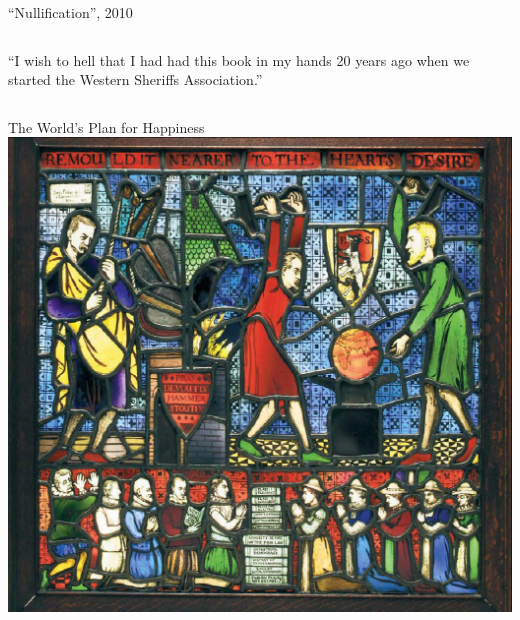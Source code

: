 \begin{frame}{``Nullification'', 2010}
\begin{columns}[c]
{            \vspace{10pt}
                \large{``I wish to hell that I had had this book in my hands 20 years ago when we started the Western Sheriffs Association.''}
            }
    \end{columns}
\end{frame}

%
%

\begin{frame}{The World's Plan for Happiness}
    \centering
    \includegraphics[height=.9\textheight]{img/remold-it.jpg} \\
\end{frame}


